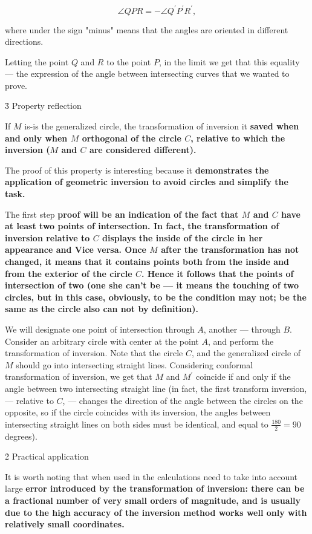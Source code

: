 $$ \angle QPR = - \angle Q^\prime P^\prime R^\prime, $$

where under the sign "minus" means that the angles are oriented in different directions.

Letting the point $Q$ and $R$ to the point $P$, in the limit we get that this equality --- the expression of the angle between intersecting curves that we wanted to prove.


\h3{ Property reflection }

If $M$ is-is the generalized circle, the transformation of inversion it \bf{saved} when and only when $M$ \bf{orthogonal} of the circle $C$, relative to which the inversion ($M$ and $C$ are considered different).

The proof of this property is interesting because it \bf{demonstrates} the application of geometric inversion to avoid circles and simplify the task.

The first step \bf{proof} will be an indication of the fact that $M$ and $C$ have at least two points of intersection. In fact, the transformation of inversion relative to $C$ displays the inside of the circle in her appearance and Vice versa. Once $M$ after the transformation has not changed, it means that it contains points both from the inside and from the exterior of the circle $C$. Hence it follows that the points of intersection of two (one she can't be --- it means the touching of two circles, but in this case, obviously, to be the condition may not; be the same as the circle also can not by definition).

We will designate one point of intersection through $A$, another --- through $B$. Consider an arbitrary circle with center at the point $A$, and perform the transformation of inversion. Note that the circle $C$, and the generalized circle of $M$ should go into intersecting straight lines. Considering conformal transformation of inversion, we get that $M$ and $M^\prime$ coincide if and only if the angle between two intersecting straight line (in fact, the first transform inversion, --- relative to $C$, --- changes the direction of the angle between the circles on the opposite, so if the circle coincides with its inversion, the angles between intersecting straight lines on both sides must be identical, and equal to $\frac{ 180 }{ 2 } = 90$ degrees).


\h2{ Practical application }

It is worth noting that when used in the calculations need to take into account large \bf{error} introduced by the transformation of inversion: there can be a fractional number of very small orders of magnitude, and is usually due to the high accuracy of the inversion method works well only with relatively small coordinates.


